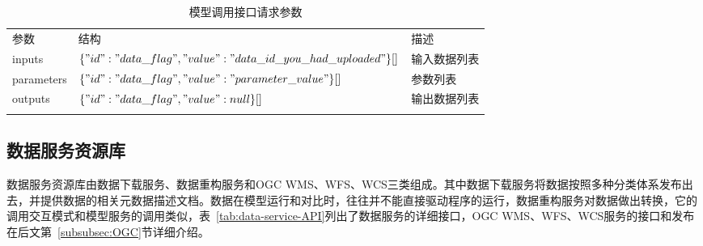 \begin{table}[!htbp]
    \centering
    \caption{模型调用接口请求参数}
    \label{tab:model-invoke-API}
    \begin{tabular}{lll}
        \Xhline{1.5pt}
        参数 & 结构 & 描述 \\
        \Xhline{1.5pt}
        inputs 
        & 
        $\{ "id": "data\_flag", "value": "data\_id\_you\_had\_uploaded" \}[]$
        & 输入数据列表 \\
        parameters 
        &
        $\{ "id": "data\_flag", "value": "parameter\_value" \}[]$
        & 参数列表 \\
        outputs 
        &
        $\{ "id": "data\_flag", "value": null \}[]$
        & 输出数据列表 \\
        \Xhline{1.5pt}
    \end{tabular}
\end{table}

\subsection{数据服务资源库}
数据服务资源库由数据下载服务、数据重构服务和OGC WMS、WFS、WCS三类组成。其中数据下载服务将数据按照多种分类体系发布出去，并提供数据的相关元数据描述文档。数据在模型运行和对比时，往往并不能直接驱动程序的运行，数据重构服务对数据做出转换，它的调用交互模式和模型服务的调用类似，表~\ref{tab:data-service-API}列出了数据服务的详细接口，OGC WMS、WFS、WCS服务的接口和发布在后文第~\ref{subsubsec:OGC}节详细介绍。

